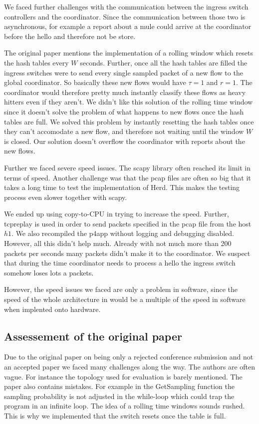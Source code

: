 \documentclass[11pt,oneside,a4paper]{article}
\begin{document}
We faced further challenges with the communication between the ingress switch controllers and the coordinator. Since the communication between those two is asynchronous, for example a report about a mule could arrive at the coordinator before the hello and therefore not be store.%

The original paper mentions the implementation of a rolling window which resets the hash tables every $W$ seconds. Further, once all the hash tables are filled the ingress switches were to send every single sampled packet of a new flow to the global coordinator. So basically these new flows would have $\tau = 1$ and $r = 1$. The coordinator would therefore pretty much instantly classify these flows as heavy hitters even if they aren't. We didn't like this solution of the rolling time window since it doesn't solve the problem of what happens to new flows once the hash tables are full. We solved this problem by instantly resetting the hash tables once they can't accomodate a new flow, and therefore not waiting until the window $W$ is closed. Our solution doesn't overflow the coordinator with reports about the new flows.

Further we faced severe speed issues. The scapy library often reached its limit in terms of speed. Another challenge was that the pcap files are often so big that it takes a long time to test the implementation of Herd. This makes the testing process even slower together with scapy. 

We ended up using copy-to-CPU in trying to increase the speed. Further, tcpreplay is used in order to send packets specified in the pcap file from the host $h1$. We also recompiled the p4app without logging and debugging disabled. However, all this didn't help much. Already with not much more than 200 packets per seconds many packets didn't make it to the coordinator. We suspect that during the time coordinator needs to process a hello the ingress switch somehow loses lots a packets.

However, the speed issues we faced are only a problem in software, since the speed of the whole architecture in would be a multiple of the speed in software when implented onto hardware.

\subsection{Assessement of the original paper} \label{original_paper}
Due to the original paper on being only a rejected conference submission and not an accepted paper we faced many challenges along the way. The authors are often vague. For instance the topology used for evaluation is barely mentioned. The paper also contains mistakes. For example in the GetSampling function the sampling probability is not adjusted in the while-loop which could trap the program in an infinite loop. The idea of a rolling time windows sounds rushed. This is why we implemented that the switch resets once the table is full.
\end{document}
